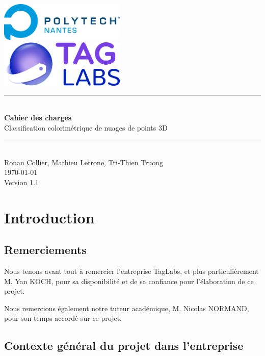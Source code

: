\documentclass[12pt,titlepage,french]{article}
\begin{document}
\begin{titlepage}
\newcommand{\HRule}{\rule{\linewidth}{0.5mm}}
\center

  \includegraphics[width=0.45\textwidth]{../ressources/img_logos/logo_polytech.png}\\[1cm]

  \includegraphics[width=0.45\textwidth]{../ressources/img_logos/logo_taglabs.png}


\HRule \\[0.4cm]
{ \huge \bfseries Cahier des charges \\[0.15cm] }
Classification colorimétrique de nuages de points 3D
\HRule \\[1.5cm]
Ronan Collier,
Mathieu Letrone,
Tri-Thien Truong
\\[1cm]
\today \\ [1cm]
Version 1.1
\end{titlepage}

\tableofcontents %
\newpage
\listoffigures  %
\newpage

\section{Introduction}

\subsection*{Remerciements}

Nous tenons avant tout à remercier l'entreprise TagLabs, et plus particulièrement M. Yan KOCH, pour sa disponibilité et de sa confiance pour l'élaboration de ce projet.

Nous remercions également notre tuteur académique, M. Nicolas NORMAND, pour son temps accordé sur ce projet.

\subsection*{Contexte général du projet dans l'entreprise}
\end{document}
